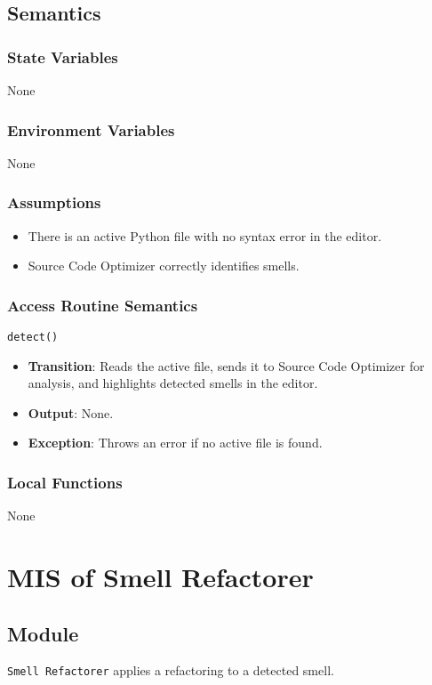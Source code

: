 \documentclass[12pt, titlepage]{article}
\begin{document}
\subsection{Semantics}

\subsubsection{State Variables}
None

\subsubsection{Environment Variables}
None


\subsubsection{Assumptions}
\begin{itemize}
\item There is an active Python file with no syntax error in the editor.
\item Source Code Optimizer correctly identifies smells.
\end{itemize}

\subsubsection{Access Routine Semantics}
\texttt{detect()}
\begin{itemize}
\item \textbf{Transition}: Reads the active file, sends it to Source Code Optimizer for analysis, and highlights detected smells in the editor.
\item \textbf{Output}: None.
\item \textbf{Exception}: Throws an error if no active file is found.
\end{itemize}

\subsubsection{Local Functions}
None

\section{MIS of Smell Refactorer}

\subsection{Module}
\texttt{Smell Refactorer} applies a refactoring to a detected smell.
\end{document}
